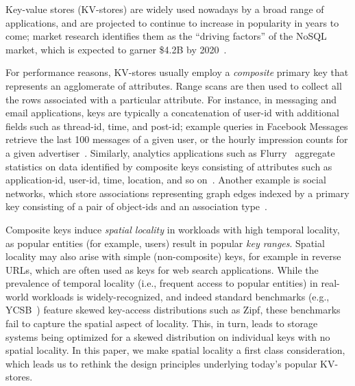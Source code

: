 


Key-value stores (KV-stores) are widely used nowadays by a broad range of applications, and are projected
to continue to increase in popularity in years to come; market research  identifies them as the 
``driving factors'' of the NoSQL market, which is expected to garner \$4.2B by 2020~\cite{alliedmarketresearch}.

For performance reasons,  KV-stores  usually  employ a \emph{composite} primary key that represents
an agglomerate of attributes. Range scans are then used to collect all the rows associated with
a particular attribute. For instance,  in messaging and email applications,  
keys are typically a concatenation of user-id with additional fields such as thread-id, time, and post-id; 
example queries in Facebook Messages retrieve  the last 100 messages of a given user, or the hourly impression counts %
for a given advertiser~\cite{Borthakur:2011:AHG:1989323.1989438}. 
Similarly, analytics applications such as Flurry~\cite{flurry}  aggregate statistics on data identified by 
composite keys consisting of attributes such as application-id, user-id, time, location, and so on~\cite{flurry-data-model}. 
Another example is social networks, which store  associations representing graph edges indexed by a primary key consisting of a 
pair of object-ids and an association type~\cite{linkbench}. 

Composite keys induce \emph{spatial locality} in workloads with high {temporal locality}, as 
popular entities (for example, users) result in popular \emph{key ranges}. 
Spatial locality may also arise with simple (non-composite) keys, for example in 
 reverse  URLs, which  are often used as keys for web search applications. 
While the prevalence of temporal locality (i.e., frequent access to popular entities) in real-world workloads is widely-recognized, 
and indeed standard benchmarks (e.g., YCSB~\cite{YCSB})  feature skewed key-access distributions such as Zipf, 
these benchmarks fail to capture the spatial aspect of locality.
This, in turn, leads to storage systems being optimized for a skewed distribution on individual keys with no spatial locality.
In this paper, we make spatial locality a first class  consideration, which 
leads us to rethink the design principles underlying today's popular KV-stores.

